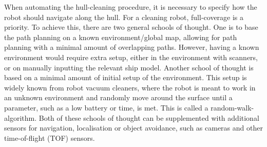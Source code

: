 When automating the hull-cleaning procedure, it is necessary to specify how the robot should navigate along the hull. For a cleaning robot, full-coverage is a priority. To achieve this, there are two general schools of thought. One is to base the path planning on a known environment/global map, allowing for path planning with a minimal amount of overlapping paths. However, having a known environment would require extra setup, either in the environment with scanners, or on manually inputting the relevant ship model. Another school of thought is based on a minimal amount of initial setup of the environment. This setup is widely known from robot vacuum cleaners, where the robot is meant to work in an unknown environment and randomly move around the surface until a parameter, such as a low battery or time, is met. This is called a random-walk-algorithm. Both of these schools of thought can be supplemented with additional sensors for navigation, localisation or object avoidance, such as cameras and other time-of-flight (TOF) sensors. %

